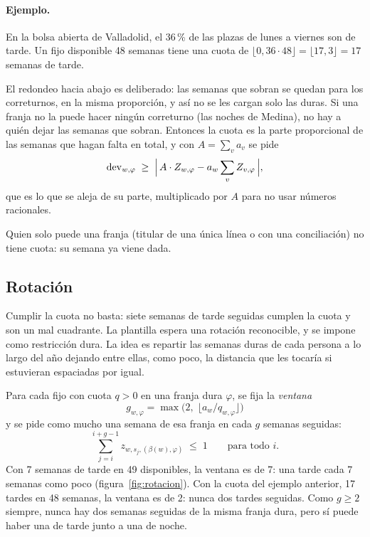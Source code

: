 \documentclass[11pt,a4paper]{article}
\begin{document}
\paragraph{Ejemplo.} En la bolsa abierta de Valladolid, el 36\,\% de las plazas de lunes a
viernes son de tarde. Un fijo disponible 48 semanas tiene una cuota de
$\lfloor 0{,}36 \cdot 48 \rfloor = \lfloor 17{,}3 \rfloor = 17$ semanas de tarde.

El redondeo hacia abajo es deliberado: las semanas que sobran se quedan para los correturnos, en
la misma proporción, y así no se les cargan solo las duras. Si una franja no la puede hacer
ningún correturno (las noches de Medina), no hay a quién dejar las semanas que sobran. Entonces
la cuota es la parte proporcional de las semanas que hagan falta en total, y con
$A = \sum_v a_v$ se pide
\[
  \mathrm{dev}_{w,\varphi} \;\ge\; \Bigl|\, A \cdot Z_{w,\varphi} - a_w \sum_v Z_{v,\varphi} \,\Bigr|,
\]
que es lo que se aleja de su parte, multiplicado por $A$ para no usar números racionales.

Quien solo puede una franja (titular de una única línea o con una conciliación) no tiene cuota:
su semana ya viene dada.

\subsection{Rotación}

Cumplir la cuota no basta: siete semanas de tarde seguidas cumplen la cuota y son un mal
cuadrante. La plantilla espera una rotación reconocible, y se impone como restricción dura. La
idea es repartir las semanas duras de cada persona a lo largo del año dejando entre ellas, como
poco, la distancia que les tocaría si estuvieran espaciadas por igual.

Para cada fijo con cuota $q > 0$ en una franja dura $\varphi$, se fija la \emph{ventana}
\[
  g_{w,\varphi} = \max\bigl(2,\; \lfloor a_w / q_{w,\varphi} \rfloor\bigr)
\]
y se pide como mucho una semana de esa franja en cada $g$ semanas seguidas:
\[
  \sum_{j=i}^{i+g-1} z_{w,s_j,(\beta(w),\varphi)} \;\le\; 1
  \qquad \text{para todo } i.
\]
Con 7 semanas de tarde en 49 disponibles, la ventana es de 7: una tarde cada 7 semanas como
poco (figura~\ref{fig:rotacion}). Con la cuota del ejemplo anterior, 17 tardes en 48 semanas, la
ventana es de 2: nunca dos tardes seguidas. Como $g \ge 2$ siempre, nunca hay dos semanas
seguidas de la misma franja dura, pero sí puede haber una de tarde junto a una de noche.
\end{document}
